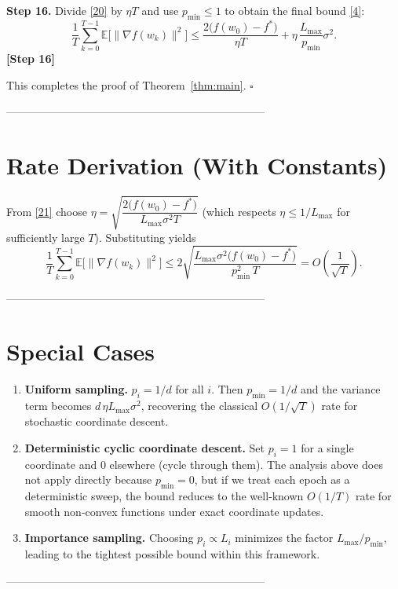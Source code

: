 \documentclass{article}
\newcommand{\E}{\mathbb{E}}
\begin{document}
\noindent\textbf{Step 16.}  Divide \eqref{20} by $\eta T$ and use $p_{\min}\le1$ to
obtain the final bound \eqref{4}:
\[
\frac{1}{T}\sum_{k=0}^{T-1}\E\!\bigl[\|\nabla f(w_k)\|^{2}\bigr]
\le
\frac{2\bigl(f(w_0)-f^{*}\bigr)}{\eta T}
      +\eta\,\frac{L_{\max}}{p_{\min}}\sigma^{2}.
\tag{21}
\] 
\textbf{[Step 16]}

This completes the proof of Theorem~\ref{thm:main}.  \hfill $\square$

-----------------------------------------------------------------------

\section*{Rate Derivation (With Constants)}
From \eqref{21} choose $\eta=\sqrt{\dfrac{2\bigl(f(w_0)-f^{*}\bigr)}{L_{\max}\sigma^{2}T}}$
(which respects $\eta\le 1/L_{\max}$ for sufficiently large $T$).  Substituting yields
\[
\frac{1}{T}\sum_{k=0}^{T-1}\E\!\bigl[\|\nabla f(w_k)\|^{2}\bigr]
\le
2\sqrt{\frac{L_{\max}\sigma^{2}\bigl(f(w_0)-f^{*}\bigr)}{p_{\min}^{2}\,T}}
=O\!\left(\frac{1}{\sqrt{T}}\right).
\]

-----------------------------------------------------------------------

\section*{Special Cases}
\begin{enumerate}[label=\arabic*.]
\item \textbf{Uniform sampling.} $p_i=1/d$ for all $i$.  
Then $p_{\min}=1/d$ and the variance term becomes $d\,\eta L_{\max}\sigma^{2}$,
recovering the classical $O(1/\sqrt{T})$ rate for stochastic coordinate descent.

\item \textbf{Deterministic cyclic coordinate descent.}  
Set $p_i=1$ for a single coordinate and $0$ elsewhere (cycle through them).  
The analysis above does not apply directly because $p_{\min}=0$,
but if we treat each epoch as a deterministic sweep, the bound reduces to the
well‑known $O(1/T)$ rate for smooth non‑convex functions under exact
coordinate updates.

\item \textbf{Importance sampling.}  
Choosing $p_i\propto L_i$ minimizes the factor $L_{\max}/p_{\min}$,
leading to the tightest possible bound within this framework.
\end{enumerate}

-----------------------------------------------------------------------
\end{document}

